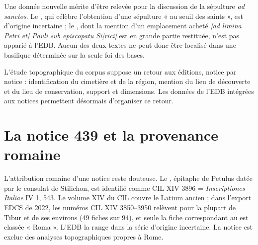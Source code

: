 Une donnée nouvelle mérite d’être relevée pour la discussion de la sépulture \emph{ad sanctos}. Le , qui célèbre l’obtention d’une sépulture « au seuil des saints », est d’origine incertaine ; le , dont la mention d’un emplacement acheté \emph{[ad limina Petri et] Pauli sub episcopatu Si[rici]} est en grande partie restituée, n’est pas apparié à l’EDB. Aucun des deux textes ne peut donc être localisé dans une basilique déterminée sur la seule foi des bases.

L’étude topographique du corpus suppose un retour aux éditions, notice par notice : identification du cimetière et de la région, mention du lieu de découverte et du lieu de conservation, support et dimensions. Les données de l’EDB intégrées aux notices permettent désormais d’organiser ce retour.

\section{La notice 439 et la provenance romaine}

L’attribution romaine d’une notice reste douteuse. Le , épitaphe de Petulus datée par le consulat de Stilichon, est identifié comme CIL XIV 3896 = \emph{Inscriptiones Italiae} IV 1, 543. Le volume XIV du CIL couvre le Latium ancien ; dans l’export EDCS de 2022, les numéros CIL XIV 3850–3950 relèvent pour la plupart de Tibur et de ses environs (49 fiches sur 94), et seule la fiche correspondant au  est classée « Roma ». L’EDB la range dans la série d’origine incertaine. La notice est exclue des analyses topographiques propres à Rome.

